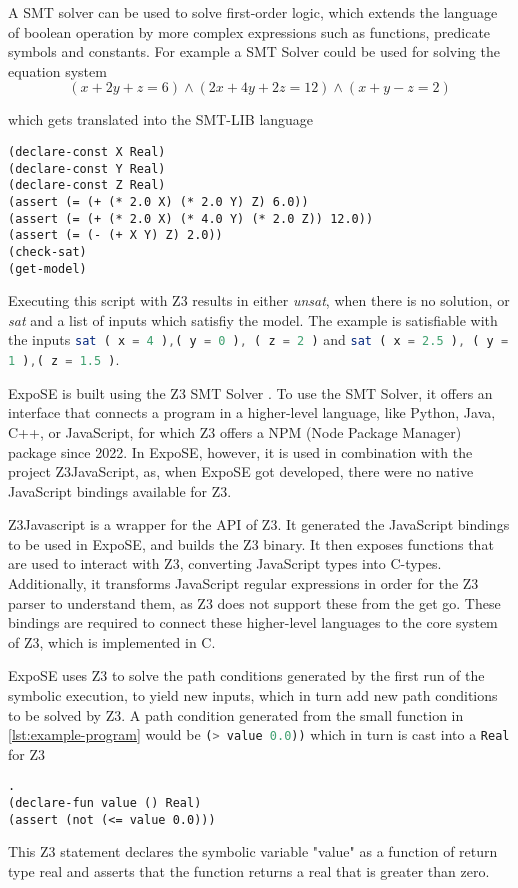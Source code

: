 A SMT solver can be used to solve first-order logic, which extends the language of boolean operation by more complex expressions such as functions, predicate symbols and constants. 
For example a SMT Solver could be used for solving the equation system
$$
    (x + 2y + z = 6 )\land
    (2x + 4y + 2z = 12 )\land
    (x + y - z = 2) 
$$

which gets translated into the SMT-LIB language \cite{barrett_smt-lib_2025}
\begin{lstlisting}
(declare-const X Real)
(declare-const Y Real)
(declare-const Z Real)
(assert (= (+ (* 2.0 X) (* 2.0 Y) Z) 6.0))
(assert (= (+ (* 2.0 X) (* 4.0 Y) (* 2.0 Z)) 12.0))
(assert (= (- (+ X Y) Z) 2.0))
(check-sat)
(get-model)
\end{lstlisting}
Executing this script with Z3 results in either \textit{unsat}, when there is no solution, or \textit{sat} and a list of inputs which satisfiy the model. The example is satisfiable with the inputs
\lstinline[language=JavaScript]+sat ( x = 4 ),( y = 0 ), ( z = 2 )+ and 
\lstinline[language=JavaScript]+sat ( x = 2.5 ), ( y = 1 ),( z = 1.5 )+. 


ExpoSE is built using the Z3 SMT Solver \cite{de_moura_z3_2008}. 
To use the SMT Solver, it offers an interface that connects a program in a higher-level language, like Python, Java, C++, or JavaScript, for which Z3 offers a NPM (Node Package Manager) package since 2022. In ExpoSE, however, it is used in combination with the project Z3JavaScript, as, when ExpoSE got developed, there were no native JavaScript bindings available for Z3. 

Z3Javascript is a wrapper for the API of Z3. It generated the JavaScript bindings to be used in ExpoSE, and builds the Z3 binary. It then exposes functions that are used to interact with Z3, converting JavaScript types into C-types. Additionally, it transforms JavaScript regular expressions in order for the Z3 parser to understand them, as Z3 does not support these from the get go. These bindings are required to connect these higher-level languages to the core system of Z3, which is implemented in C.

ExpoSE uses Z3 to solve the path conditions generated by the first run of the symbolic execution, to yield new inputs, which in turn add new path conditions to be solved by Z3. 
A path condition generated from the small function in \autoref{lst:example-program} would be \lstinline[language=JavaScript]+(> value 0.0))+ which in turn is cast into a {\tt{Real}} for Z3
\begin{lstlisting}.
(declare-fun value () Real)
(assert (not (<= value 0.0)))
\end{lstlisting}
This Z3 statement declares the symbolic variable "value" as a function of return type real and asserts that the function returns a real that is greater than zero.  


